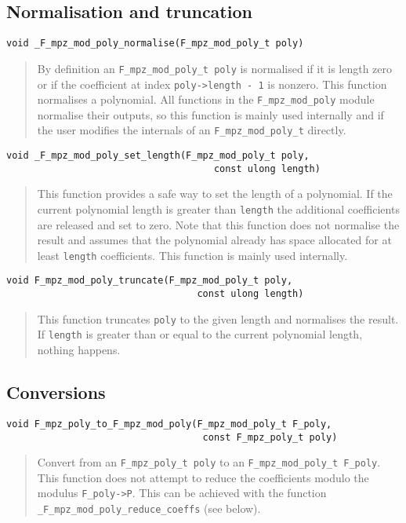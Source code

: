 \documentclass[a4paper,10pt]{article}
\newcommand{\code}{\lstinline}
\begin{document}
\subsection{Normalisation and truncation}

\begin{lstlisting}
void _F_mpz_mod_poly_normalise(F_mpz_mod_poly_t poly)
\end{lstlisting}
\begin{quote}
By definition an \code{F_mpz_mod_poly_t poly} is normalised if it is length zero or if the coefficient at 
index \code{poly->length - 1} is nonzero. This function normalises a polynomial. All functions in the 
\code{F_mpz_mod_poly} module normalise their outputs, so this function is mainly used internally and if
the user modifies the internals of an \code{F_mpz_mod_poly_t} directly.
\end{quote}

\begin{lstlisting}
void _F_mpz_mod_poly_set_length(F_mpz_mod_poly_t poly, 
                                     const ulong length)
\end{lstlisting}
\begin{quote}
This function provides a safe way to set the length of a polynomial. If the current polynomial length
is greater than \code{length} the additional coefficients are released and set to zero. Note that this
function does not normalise the result and assumes that the polynomial already has space allocated for
at least \code{length} coefficients. This function is mainly used internally.
\end{quote}

\begin{lstlisting}
void F_mpz_mod_poly_truncate(F_mpz_mod_poly_t poly, 
                                  const ulong length)
\end{lstlisting}
\begin{quote}
This function truncates \code{poly} to the given length and normalises the result. If \code{length} is 
greater than or equal to the current polynomial length, nothing happens.
\end{quote}

\subsection{Conversions}

\begin{lstlisting}
void F_mpz_poly_to_F_mpz_mod_poly(F_mpz_mod_poly_t F_poly, 
                                   const F_mpz_poly_t poly)
\end{lstlisting}
\begin{quote}
Convert from an \code{F_mpz_poly_t poly} to an \code{F_mpz_mod_poly_t F_poly}. This function does not 
attempt to reduce the coefficients modulo the modulus \code{F_poly->P}. This can be achieved with the
function \code{_F_mpz_mod_poly_reduce_coeffs} (see below).
\end{quote}
\end{document}
